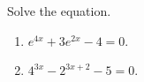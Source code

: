 Solve the equation.
\begin{enumerate}
\item $e^{4x}+3e^{2x}-4=0$. 
\item $4^{3x}-2^{3x+2}-5=0$. 
\end{enumerate}
